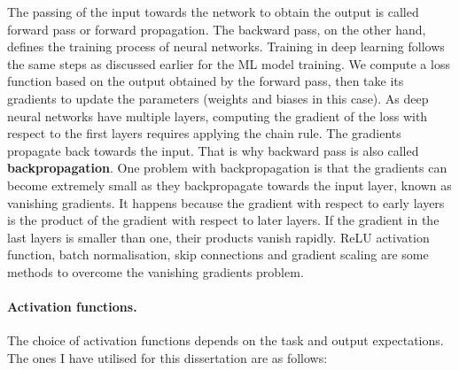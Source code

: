 The passing of the input towards the network to obtain the output is called forward pass or forward propagation. The backward pass, on the other hand, defines the training process of neural networks. Training in deep learning follows the same steps as discussed earlier for the \gls{ML} model training. We compute a loss function based on the output obtained by the forward pass, then take its gradients to update the parameters (weights and biases in this case). As deep neural networks have multiple layers, computing the gradient of the loss with respect to the first layers requires applying the chain rule. The gradients propagate back towards the input. That is why backward pass is also called \textbf{backpropagation}. One problem with backpropagation is that the gradients can become extremely small as they backpropagate towards the input layer, known as vanishing gradients. It happens because the gradient with respect to early layers is the product of the gradient with respect to later layers. If the gradient in the last layers is smaller than one, their products vanish rapidly. ReLU activation function, batch normalisation, skip connections and gradient scaling are some methods to overcome the vanishing gradients problem.

\paragraph{Activation functions.} The choice of activation functions depends on the task and output expectations. The ones I have utilised for this dissertation are as follows:

